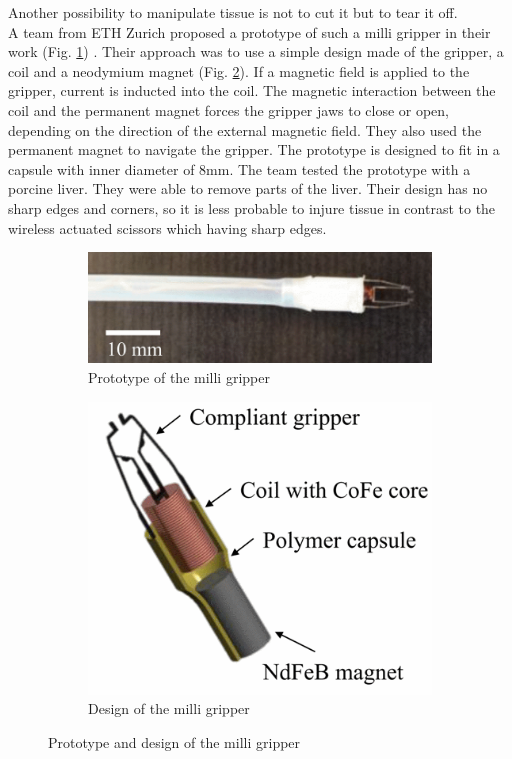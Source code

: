 Another possibility to manipulate tissue is not to cut it but to tear it off. \\
A team from ETH Zurich proposed a prototype of such a milli gripper in their work (Fig. \ref{fig:gripper_prototype}) \cite{MilliGripper}. Their approach was to use a simple design made of the gripper, a coil and a neodymium magnet (Fig. \ref{fig:gripper_design}). If a magnetic field is applied to the gripper, current is inducted into the coil. The magnetic interaction between the coil and the permanent magnet forces the gripper jaws to close or open, depending on the direction of the external magnetic field. They also used the permanent magnet to navigate the gripper. The prototype is designed to fit in a capsule with inner diameter of 8mm. The team tested the prototype with a porcine liver. They were able to remove parts of the liver. Their design has no sharp edges and corners, so it is less probable to injure tissue in contrast to the wireless actuated scissors which having sharp edges.
\begin{figure}[H]
    \centering
    \begin{subfigure}[b]{0.45\textwidth}
        \includegraphics[width=\textwidth]{Figures/prototype_gripper.png}
        \caption{Prototype of the milli gripper}
        \label{fig:gripper_prototype}
    \end{subfigure}
    \qquad
    \begin{subfigure}[b]{0.45\textwidth}
        \includegraphics[width=\textwidth]{Figures/structure_gripper.png}
        \caption{Design of the milli gripper}
        \label{fig:gripper_design}
    \end{subfigure}
    \caption{Prototype and design of the milli gripper \cite{MilliGripper}}
    \label{fig:gripper}
\end{figure}
